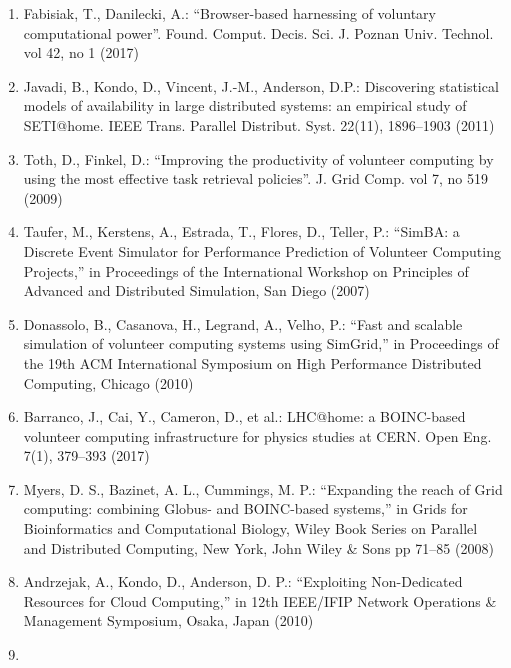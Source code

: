 \documentclass[
]{article}
\begin{document}
\begin{enumerate}
  extensible framework for volunteer computing using Java''.
  Concurrency: Pract. Exp. vol.~10, no 11--13 (1998)
\item
  Fabisiak, T., Danilecki, A.: ``Browser-based harnessing of voluntary
  computational power''. Found. Comput. Decis. Sci. J. Poznan Univ.
  Technol. vol 42, no 1 (2017)\\
\item
  Javadi, B., Kondo, D., Vincent, J.-M., Anderson, D.P.: Discovering
  statistical models of availability in large distributed systems: an
  empirical study of SETI@home. IEEE Trans. Parallel Distribut. Syst.
  22(11), 1896--1903 (2011)\\
\item
  Toth, D., Finkel, D.: ``Improving the productivity of volunteer
  computing by using the most effective task retrieval policies''. J.
  Grid Comp. vol 7, no 519 (2009)\\
\item
  Taufer, M., Kerstens, A., Estrada, T., Flores, D., Teller, P.:
  ``SimBA: a Discrete Event Simulator for Performance Prediction of
  Volunteer Computing Projects,'' in Proceedings of the International
  Workshop on Principles of Advanced and Distributed Simulation, San
  Diego (2007)\\
\item
  Donassolo, B., Casanova, H., Legrand, A., Velho, P.: ``Fast and
  scalable simulation of volunteer computing systems using SimGrid,'' in
  Proceedings of the 19th ACM International Symposium on High
  Performance Distributed Computing, Chicago (2010)\\
\item
  Barranco, J., Cai, Y., Cameron, D., et al.: LHC@home: a BOINC-based
  volunteer computing infrastructure for physics studies at CERN. Open
  Eng. 7(1), 379--393 (2017)\\
\item
  Myers, D. S., Bazinet, A. L., Cummings, M. P.: ``Expanding the reach
  of Grid computing: combining Globus- and BOINC-based systems,'' in
  Grids for Bioinformatics and Computational Biology, Wiley Book Series
  on Parallel and Distributed Computing, New York, John Wiley \& Sons pp
  71--85 (2008)\\
\item
  Andrzejak, A., Kondo, D., Anderson, D. P.: ``Exploiting Non-Dedicated
  Resources for Cloud Computing,'' in 12th IEEE/IFIP Network Operations
  \& Management Symposium, Osaka, Japan (2010)\\
\item

\end{enumerate}
\end{document}
